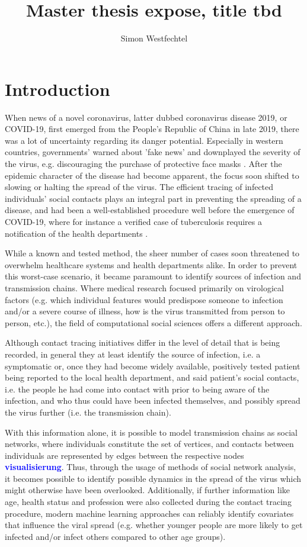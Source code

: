 \documentclass{article}
\title{Master thesis expose, title tbd}
\author{Simon Westfechtel}
\newcommand{\add}[1]{\textbf{\textcolor{blue}{#1}}}
\begin{document}
	\maketitle

	\section{Introduction}
	\label{sec:Introduction}
	When news of a novel coronavirus, latter dubbed coronavirus disease 2019, or COVID-19, first emerged from the People's Republic of China in late 2019, there was a lot of uncertainty regarding its danger potential. Especially in western countries, governments' warned about 'fake news' and downplayed the severity of the virus, e.g. discouraging the purchase of protective face masks \cite{osthessen_news}\cite{tagesschau_1}\cite{tagesschau_2}. After the epidemic character of the disease had become apparent, the focus soon shifted to slowing or halting the spread of the virus. The efficient tracing of infected individuals' social contacts plays an integral part in preventing the spreading of a disease, and had been a well-established procedure well before the emergence of COVID-19, where for instance a verified case of tuberculosis requires a notification of the health departments \cite{enwiki_1097839709}. 
	
	While a known and tested method, the sheer number of cases soon threatened to overwhelm healthcare systems and health departments alike. In order to prevent this worst-case scenario, it became paramount to identify sources of infection and transmission chains. Where medical research focused primarily on virological factors (e.g. which individual features would predispose someone to infection and/or a severe course of illness, how is the virus transmitted from person to person, etc.), the field of computational social sciences offers a different approach. 
	
	Although contact tracing initiatives differ in the level of detail that is being recorded, in general they at least identify the source of infection, i.e. a symptomatic or, once they had become widely available, positively tested patient being reported to the local health department, and said patient's social contacts, i.e. the people he had come into contact with prior to being aware of the infection, and who thus could have been infected themselves, and possibly spread the virus further (i.e. the transmission chain). 
	
	With this information alone, it is possible to model transmission chains as social networks, where individuals constitute the set of vertices, and contacts between individuals are represented by edges between the respective nodes \add{visualisierung}. Thus, through the usage of methods of social network analysis, it becomes possible to identify possible dynamics in the spread of the virus which might otherwise have been overlooked. Additionally, if further information like age, health status and profession were also collected during the contact tracing procedure, modern machine learning approaches can reliably identify covariates that influence the viral spread (e.g. whether younger people are more likely to get infected and/or infect others compared to other age groups).
	
\end{document}
